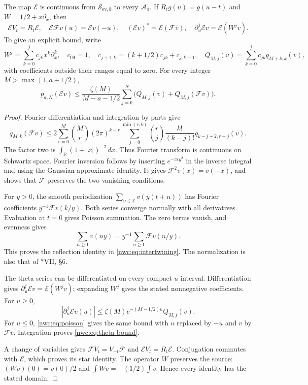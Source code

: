 \begin{theorem}\label{nwc:thm:theta}
The map $\mathcal E$ is continuous from $\mathcal S_{\mathrm{ev},0}$
to every $\mathcal A_a$. If $R_tg(u)=g(u-t)$ and
$W=1/2+x\partial_x$, then
\begin{equation}\label{nwc:eq:intertwining}
 \mathcal EV_t=R_t\mathcal E,\quad
 \mathcal E\mathcal Fv(u)=\mathcal Ev(-u),\quad
 (\mathcal Ev)^*=\mathcal E(\mathcal F\bar v),\quad
 \partial_u^j\mathcal Ev=\mathcal E(W^jv).
\end{equation}
To give an explicit bound, write
\[
 W^j=\sum_{k=0}^j c_{jk}x^k\partial_x^k,
 \quad c_{00}=1,\quad
 c_{j+1,k}=(k+1/2)c_{jk}+c_{j,k-1},
 \quad Q_{M,j}(v)=\sum_{k=0}^jc_{jk}q_{M+k,k}(v),
\]
with coefficients outside their ranges equal to zero.
For every integer $M>\max(1,a+1/2)$,
\begin{equation}\label{nwc:eq:theta-bound}
 p_{a,N}(\mathcal Ev)\leq
 \frac{\zeta(M)}{M-a-1/2}
 \sum_{j=0}^N\bigl(Q_{M,j}(v)+Q_{M,j}(\mathcal Fv)\bigr).
\end{equation}
\end{theorem}
\begin{proof}
Fourier differentiation and integration by parts give
\[
 q_{M,k}(\mathcal Fv)\leq
 2\sum_{r=0}^M\binom Mr(2\pi)^{k-r}
 \sum_{j=0}^{\min(r,k)}\binom rj\frac{k!}{(k-j)!}
 q_{k-j+2,r-j}(v).
\]
The factor two is $\int_{\mathbb R}(1+|x|)^{-2}\,dx$.
Thus Fourier transform is continuous on Schwartz space.
Fourier inversion follows by inserting $e^{-\pi\epsilon y^2}$
in the inverse integral and using the Gaussian approximate identity.
It gives $\mathcal F^2v(x)=v(-x)$, and shows that $\mathcal F$
preserves the two vanishing conditions.

For $y>0$, the smooth periodization
$\sum_{n\in\mathbb Z}v(y(t+n))$ has Fourier coefficients
$y^{-1}\mathcal Fv(k/y)$. Both series converge normally with all
derivatives. Evaluation at $t=0$ gives Poisson summation.
The zero terms vanish, and evenness gives
\begin{equation}\label{nwc:eq:poisson}
 \sum_{n\geq1}v(ny)=y^{-1}\sum_{n\geq1}\mathcal Fv(n/y).
\end{equation}
This proves the reflection identity in \eqref{nwc:eq:intertwining}.
The normalization is also that of \cite{nwc:Serre}*{VII, \S6}.

The theta series can be differentiated on every compact $u$ interval.
Differentiation gives $\partial_u^j\mathcal Ev=\mathcal E(W^jv)$;
expanding $W^j$ gives the stated nonnegative coefficients.
For $u\geq0$,
\[
 |\partial_u^j\mathcal Ev(u)|
 \leq\zeta(M)e^{-(M-1/2)u}Q_{M,j}(v).
\]
For $u\leq0$, \eqref{nwc:eq:poisson} gives the same bound with
$u$ replaced by $-u$ and $v$ by $\mathcal Fv$.
Integration proves \eqref{nwc:eq:theta-bound}.

A change of variables gives
$\mathcal FV_t=V_{-t}\mathcal F$ and $\mathcal EV_t=R_t\mathcal E$.
Conjugation commutes with $\mathcal E$, which proves its star identity.
The operator $W$ preserves the source: $(Wv)(0)=v(0)/2$ and
$\int Wv=-(1/2)\int v$. Hence every identity has the stated domain.
\end{proof}

